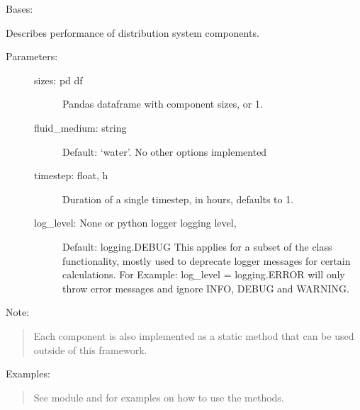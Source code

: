 \documentclass[letterpaper,10pt,english,openany]{sphinxmanual}
\begin{document}
\begin{fulllineitems}
\label{\detokenize{source/mswh.system:mswh.system.components.Distribution}}
Bases: 

Describes performance of distribution system components.
\begin{description}
\item[{Parameters:}] \leavevmode\begin{description}
\item[{sizes: pd df}] \leavevmode
Pandas dataframe with component sizes, or 1.

\item[{fluid\_medium: string}] \leavevmode
Default: ‘water’. No other options implemented

\item[{timestep: float, h}] \leavevmode
Duration of a single timestep, in hours, defaults to 1.

\item[{log\_level: None or python logger logging level,}] \leavevmode
Default: logging.DEBUG
This applies for a subset of the class functionality, mostly
used to deprecate logger messages for certain calculations.
For Example: log\_level = logging.ERROR will only throw error
messages and ignore INFO, DEBUG and WARNING.

\end{description}

\end{description}

Note:
\begin{quote}

Each component is also implemented as a static method that
can be used outside of this framework.
\end{quote}

Examples:
\begin{quote}

See  module and
for examples on how to use the methods.
\end{quote}


\end{fulllineitems}
\end{document}

